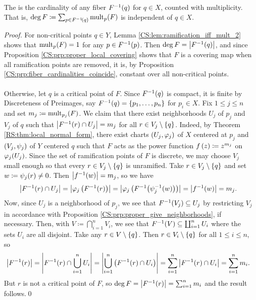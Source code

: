 \documentclass[../Moduli_Spaces_of_Riemann_Surfaces.tex]{subfiles}
\begin{document}
    \begin{defthm}\label{CS:thm:degree_sum_of_multiplicities}
        The  is the cardinality of any fiber $F^{-1}\!\left(q\right)$ for $q\in X$, counted with multiplicity. That is, $\deg F\coloneqq\sum_{p\in F^{-1}\!\left(q\right)}\operatorname{mult}_p\!\left(F\right)$ is independent of $q\in X$.
    \end{defthm}
    \begin{proof}
        For non-critical points $q\in Y$, Lemma \ref{CS:lem:ramification_iff_mult_2} shows that $\operatorname{mult}_p\!\left(F\right)=1$ for any $p\in F^{-1}\!\left(p\right)$. Then $\deg F=\left|F^{-1}\!\left(q\right)\right|$, and since Proposition \ref{CS:prp:proper_local_covering} shows that $F$ is a covering map when all ramification points are removed, it is, by Proposition \ref{CS:prp:fiber_cardinalities_coincide}, constant over all non-critical points.\\\ \\
        Otherwise, let $q$ is a critical point of $F$. Since $F^{-1}\!\left(q\right)$ is compact, it is finite by Discreteness of Preimages, say $F^{-1}\!\left(q\right)=\left\{p_1,\dots,p_n\right\}$ for $p_i\in X$. Fix $1\leq j\leq n$ and set $m_j\coloneqq\operatorname{mult}_{p_j}\!\left(F\right)$. We claim that there exist neighborhoods $U_j$ of $p_j$ and $V_j$ of $q$ such that $\left|F^{-1}\!\left(r\right)\cap U_j\right|=m_j$ for all $r\in V_j\setminus\left\{q\right\}$. Indeed, by Theorem \ref{RS:thm:local_normal_form}, there exist charts $\left(U_j,\varphi_j\right)$ of $X$ centered at $p_j$ and $\left(V_j,\psi_j\right)$ of $Y$ centered $q$ such that $F$ acts as the power function $f\left(z\right)\coloneqq z^{m_j}$ on $\varphi_j\!\left(U_j\right)$. Since the set of ramification points of $F$ is discrete, we may choose $V_j$ small enough so that every $r\in V_j\setminus\left\{q\right\}$ is unramified. Take $r\in V_j\setminus\left\{q\right\}$ and set $w\coloneqq\psi_j\!\left(r\right)\neq0$. Then $\left|f^{-1}\!\left(w\right)\right|=m_j$, so we have
        \begin{equation*}
            \left|F^{-1}\!\left(r\right)\cap U_j\right|=\left|\varphi_j\left(F^{-1}\!\left(r\right)\right)\right|=\left|\varphi_j\left(F^{-1}\!\left(\psi_j^{-1}\!\left(w\right)\right)\right)\right|=\left|f^{-1}\!\left(w\right)\right|=m_j.
        \end{equation*}
        Now, since $U_j$ is a neighborhood of $p_j$, we see that $F^{-1}\!\left(V_j\right)\subseteq U_j$ by restricting $V_j$ in accordance with Proposition \ref{CS:prp:proper_give_neighborhoods}, if necessary. Then, with $V\coloneqq\bigcap_{i=1}^{n}V_i$, we see that $F^{-1}\!\left(V\right)\subseteq\coprod_{i=1}^{n}U_i$ where the sets $U_i$ are all disjoint. Take any $r\in V\setminus\left\{q\right\}$. Then $r\in V_i\setminus\left\{q\right\}$ for all $1\leq i\leq n$, so
        \begin{equation*}
            \left|F^{-1}\!\left(r\right)\right|=\left|F^{-1}\!\left(r\right)\cap\bigcup_{i=1}^{n}U_i\right|=\left|\bigcup_{i=1}^{n}\left(F^{-1}\!\left(r\right)\cap U_i\right)\right|=\sum_{i=1}^{n}\left|F^{-1}\!\left(r\right)\cap U_i\right|=\sum_{i=1}^{n}m_i.
        \end{equation*}
        But $r$ is not a critical point of $F$, so $\deg F=\left|F^{-1}\!\left(r\right)\right|=\sum_{i=1}^{n}m_i$ and the result follows.\qed
    \end{proof}
\end{document}
